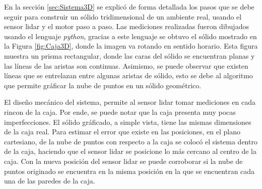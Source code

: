 En la sección \ref{sec:Sistema3D} se explicó de forma detallada los pasos que 
se debe seguir para construir un sólido tridimensional de un ambiente real, 
usando el sensor lidar y el motor paso a paso. Las mediciones realizadas fueron 
dibujados usando el lenguaje \textit{python}, gracias a este lenguaje se obtuvo 
el sólido mostrado en la Figura \ref{fig:Caja3D}, donde la imagen va rotando en 
sentido horario. Esta figura muestra un prisma rectangular, donde las caras del 
sólido se encuentran planas y las líneas de las aristas son continuas. Asimismo, 
se puede observar que existen líneas que se entrelazan entre algunas aristas de 
sólido, esto se debe al algoritmo que permite gráficar la nube de puntos en un 
sólido geométrico.

El diseño mecánico del sistema, permite al sensor lidar tomar mediciones en cada 
rincon de la caja. Por ende, se puede notar que la caja presenta muy pocas 
imperfecciones. El sólido gráficado, a simple vista, tiene las mismas dimensiones 
de la caja real. Para estimar el error que existe en las posiciones, en el 
plano cartesiano, de la nube de puntos con respecto a la caja se colocó el sistema 
dentro de la caja, haciendo que el sensor lidar se posicione lo más cercano al 
centro de la caja. Con la nueva posición del sensor lidar se puede corroborar si 
la nube de puntos originado se encuentra en la misma posición en la que 
se encuentran cada una de las paredes de la caja.

